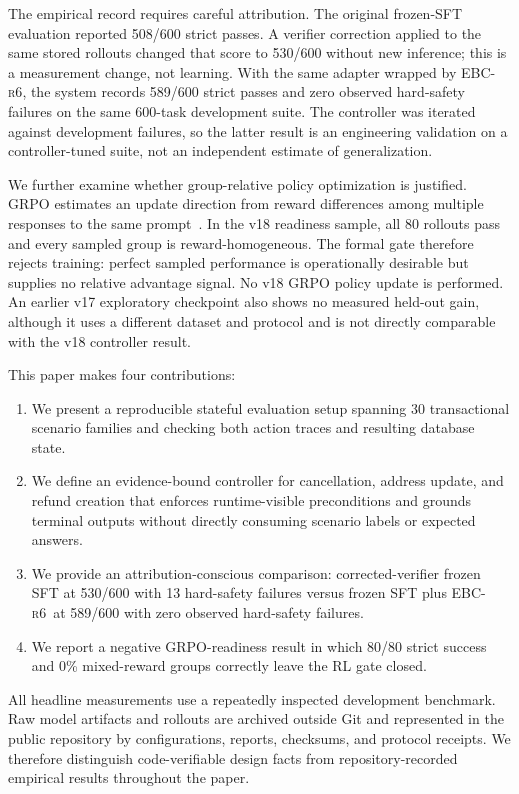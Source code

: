 \documentclass[11pt]{article}
\newcommand{\controller}{\textsc{EBC-r6}}
\begin{document}
The empirical record requires careful attribution. The original frozen-SFT evaluation reported 508/600 strict passes. A verifier correction applied to the same stored rollouts changed that score to 530/600 without new inference; this is a measurement change, not learning. With the same adapter wrapped by \controller, the system records 589/600 strict passes and zero observed hard-safety failures on the same 600-task development suite. The controller was iterated against development failures, so the latter result is an engineering validation on a controller-tuned suite, not an independent estimate of generalization.

We further examine whether group-relative policy optimization is justified. GRPO estimates an update direction from reward differences among multiple responses to the same prompt~\citep{shao2024deepseekmath}. In the v18 readiness sample, all 80 rollouts pass and every sampled group is reward-homogeneous. The formal gate therefore rejects training: perfect sampled performance is operationally desirable but supplies no relative advantage signal. No v18 GRPO policy update is performed. An earlier v17 exploratory checkpoint also shows no measured held-out gain, although it uses a different dataset and protocol and is not directly comparable with the v18 controller result.

This paper makes four contributions:

\begin{enumerate}
  \item We present a reproducible stateful evaluation setup spanning 30 transactional scenario families and checking both action traces and resulting database state.
  \item We define an evidence-bound controller for cancellation, address update, and refund creation that enforces runtime-visible preconditions and grounds terminal outputs without directly consuming scenario labels or expected answers.
  \item We provide an attribution-conscious comparison: corrected-verifier frozen SFT at 530/600 with 13 hard-safety failures versus frozen SFT plus \controller\ at 589/600 with zero observed hard-safety failures.
  \item We report a negative GRPO-readiness result in which 80/80 strict success and 0\% mixed-reward groups correctly leave the RL gate closed.
\end{enumerate}

All headline measurements use a repeatedly inspected development benchmark. Raw model artifacts and rollouts are archived outside Git and represented in the public repository by configurations, reports, checksums, and protocol receipts. We therefore distinguish code-verifiable design facts from repository-recorded empirical results throughout the paper.
\end{document}
